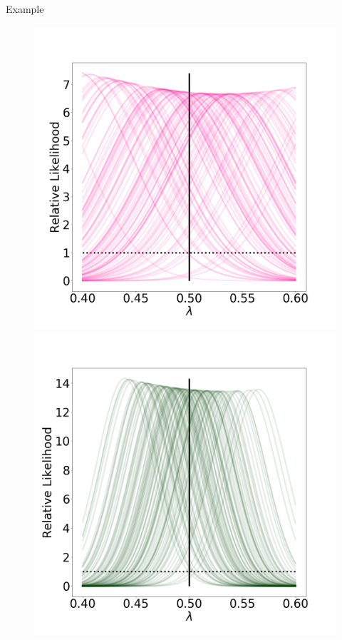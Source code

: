 \begin{block}{Example}


\vspace{-1cm}
    \begin{figure}
        \includegraphics[width=12cm]{updated_stability_D1_sigma-10E-4}
        \includegraphics[width=12cm]{updated_stability_D10_sigma-10E-4}

\end{figure}
\end{block}
